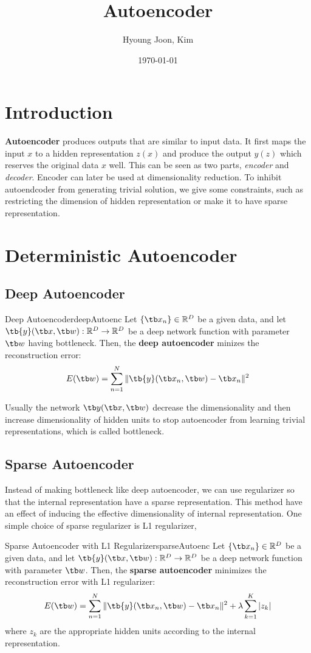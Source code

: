 \documentclass{article}
\title{Autoencoder}
\author{Hyoung Joon, Kim}
\date{\today}
\begin{document}
\maketitle
\tableofcontents
\newpage

\section{Introduction}
    \textbf{Autoencoder} produces outputs that are similar to input data. It first maps the input $x$ to
    a hidden representation $z(x)$ and produce the output $y(z)$ which reserves the original data $x$ well.
    This can be seen as two parts, \emph{encoder} and \emph{decoder}. Encoder can later be used at dimensionality reduction.
    To inhibit autoendcoder from generating trivial solution, we give some constraints, such as restricting the
    dimension of hidden representation or make it to have sparse representation.

\section{Deterministic Autoencoder}
    \subsection{Deep Autoencoder}
        \begin{defn}{Deep Autoencoder}{deepAutoenc}
            Let $\{\tb x_n\} \in \mathbb{R}^D$ be a given data, and let $\tb{y}(\tb x, \tb w) : \mathbb{R}^D \to \mathbb{R}^D$
            be a deep network function with parameter $\tb w$ having bottleneck.
            Then, the \textbf{deep autoencoder} minizes the reconstruction error:
            \[
            E(\tb w)=\sum_{n=1}^{N}\|\tb{y}(\tb x_n, \tb w) - \tb x_n\|^2
            \]
        \end{defn}
        Usually the network $\tb y(\tb x, \tb w)$ decrease the dimensionality and then increase dimensionality of hidden units to stop autoencoder from learning
        trivial representations, which is called bottleneck.
    \subsection{Sparse Autoencoder}
        Instead of making bottleneck like deep autoencoder, we can use regularizer so that the internal representation have a sparse representation.
        This method have an effect of inducing the effective dimensionality of internal representation.
        One simple choice of sparse regularizer is L1 regularizer, 
        \begin{defn}{Sparse Autoencoder with L1 Regularizer}{sparseAutoenc}
            Let $\{\tb x_n\} \in \mathbb{R}^D$ be a given data, and let $\tb{y}(\tb x, \tb w) : \mathbb{R}^D \to \mathbb{R}^D$
            be a deep network function with parameter $\tb w$.
            Then, the \textbf{sparse autoencoder} minimizes the reconstruction error with L1 regularizer:
            \[
            E(\tb w)=\sum_{n=1}^{N}\|\tb{y}(\tb x_n, \tb w) - \tb x_n\|^2 + \lambda\sum_{k=1}^{K}|z_k|
            \]
            where $z_k$ are the appropriate hidden units according to the internal representation.
        \end{defn}
\end{document}
